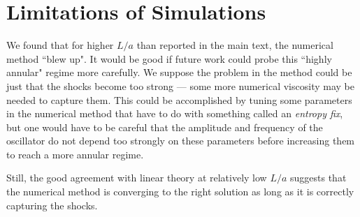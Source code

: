 \documentclass[12pt]{article}
\begin{document}
\section{Limitations of Simulations}
\label{sec:problems}
We found that for higher $L/a$ than reported in the main text, the numerical method ``blew up".  It would be good if future work could probe this ``highly annular" regime more carefully.  We suppose the problem in the method could be just that the shocks become too strong --- some more numerical viscosity may be needed to capture them.  This could be accomplished by tuning some parameters in the numerical method that have to do with something called an \textit{entropy fix}, but one would have to be careful that the amplitude and frequency of the oscillator do not depend too strongly on these parameters before increasing them to reach a more annular regime.

Still, the good agreement with linear theory at relatively low $L/a$ suggests that the numerical method is converging to the right solution as long as it is correctly capturing the shocks.
 


 
\end{document}
